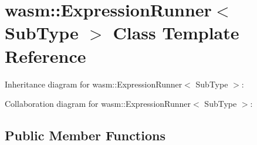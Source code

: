 \hypertarget{classwasm_1_1_expression_runner}{}\section{wasm\+:\+:Expression\+Runner$<$ Sub\+Type $>$ Class Template Reference}
\label{classwasm_1_1_expression_runner}


Inheritance diagram for wasm\+:\+:Expression\+Runner$<$ Sub\+Type $>$\+:


Collaboration diagram for wasm\+:\+:Expression\+Runner$<$ Sub\+Type $>$\+:
\subsection*{Public Member Functions}
